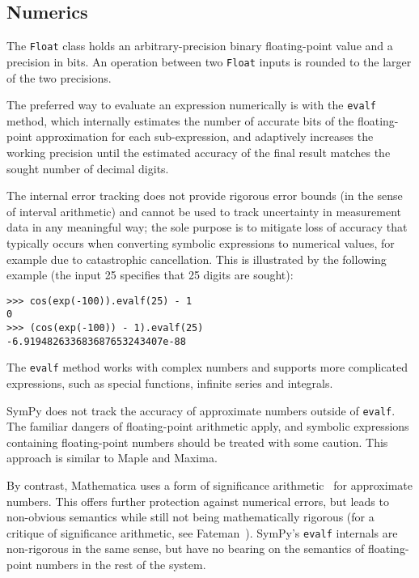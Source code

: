 


\subsection{Numerics}

The \texttt{Float} class holds an arbitrary-precision binary floating-point value
and a precision in bits. An operation between two \texttt{Float}
inputs is rounded to the larger of the two precisions.

The preferred way to evaluate an expression numerically is with the
\texttt{evalf} method, which internally estimates the number of accurate
bits of the floating-point
approximation for each sub-expression, and adaptively increases the
working precision until the estimated accuracy of the
final result matches the sought number of decimal digits.

The internal error tracking does not provide rigorous error bounds
(in the sense of interval arithmetic) and cannot be used to track
uncertainty in measurement data in any meaningful way;
the sole purpose is to mitigate loss of accuracy that typically occurs
when converting symbolic expressions to numerical values, for example
due to catastrophic cancellation. This is illustrated by the following
example (the input 25 specifies that 25 digits are sought):

\begin{verbatim}
>>> cos(exp(-100)).evalf(25) - 1
0
>>> (cos(exp(-100)) - 1).evalf(25)
-6.919482633683687653243407e-88
\end{verbatim}

The \texttt{evalf} method works with complex numbers and supports
more complicated expressions, such as
special functions, infinite series and integrals.

SymPy does not track the accuracy of
approximate numbers outside of \texttt{evalf}.
The familiar dangers of floating-point arithmetic apply, and 
symbolic expressions containing floating-point numbers should be treated
with some caution.
This approach is similar to Maple and Maxima.

By contrast, Mathematica uses a form
of significance arithmetic~\cite{Sofroniou2005precise} for approximate numbers.
This offers further protection against numerical errors,
but leads to non-obvious semantics while
still not being mathematically rigorous
(for a critique of significance arithmetic, see Fateman~\cite{Fateman1992}).
SymPy's \texttt{evalf} internals are non-rigorous in the same sense,
but have no bearing on the semantics of floating-point
numbers in the rest of the system.

